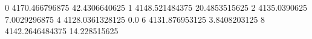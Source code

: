 0 4170.466796875 42.4306640625
1 4148.521484375 20.4853515625
2 4135.0390625 7.0029296875
4 4128.0361328125 0.0
6 4131.876953125 3.8408203125
8 4142.2646484375 14.228515625

